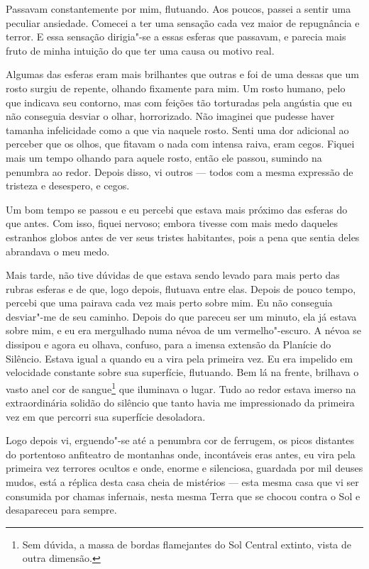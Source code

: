 Passavam constantemente por mim, flutuando. Aos poucos, passei a sentir uma peculiar ansiedade. Comecei a ter uma
sensação cada vez maior de repugnância e terror. E essa sensação dirigia"-se a essas esferas que passavam, e parecia
mais fruto de minha intuição do que ter uma causa ou motivo real.

Algumas das esferas eram mais brilhantes que outras e foi de uma dessas que um rosto surgiu de repente, olhando
fixamente para mim. Um rosto humano, pelo que indicava seu contorno, mas com feições tão torturadas pela angústia que
eu não conseguia desviar o olhar, horrorizado. Não imaginei que pudesse haver tamanha infelicidade como a que via
naquele rosto. Senti uma dor adicional ao perceber que os olhos, que fitavam o nada com intensa raiva, eram cegos.
Fiquei mais um tempo olhando para aquele rosto, então ele passou, sumindo na penumbra ao redor. Depois disso, vi
outros --- todos com a mesma expressão de tristeza e desespero, e cegos. 

Um bom tempo se passou e eu percebi que estava mais próximo das esferas do que antes. Com isso, fiquei nervoso; embora
tivesse com mais medo daqueles estranhos globos antes de ver seus tristes habitantes, pois a pena que sentia deles
abrandava o meu medo.

Mais tarde, não tive dúvidas de que estava sendo levado para mais perto das rubras esferas e de que, logo depois,
flutuava entre elas. Depois de pouco tempo, percebi que uma pairava cada vez mais perto sobre mim. Eu não conseguia
desviar"-me de seu caminho. Depois do que pareceu ser um minuto, ela já estava sobre mim, e eu era mergulhado numa névoa
de um vermelho"-escuro. A névoa se dissipou e agora eu olhava, confuso, para a imensa extensão da Planície do Silêncio.
Estava igual a quando eu a vira pela primeira vez. Eu era impelido em velocidade constante sobre sua superfície,
flutuando. Bem lá na frente, brilhava o vasto anel cor de sangue\footnote{ Sem dúvida, a massa de bordas
flamejantes do Sol Central extinto, vista de outra dimensão.} que iluminava o lugar. Tudo ao redor estava imerso
na extraordinária solidão do silêncio que tanto havia me impressionado da primeira vez em que percorri sua superfície
desoladora.

Logo depois vi, erguendo"-se até a penumbra cor de ferrugem, os picos distantes do portentoso anfiteatro de montanhas
onde, incontáveis eras antes, eu vira pela primeira vez terrores ocultos e onde, enorme e silenciosa, guardada por mil
deuses mudos, está a réplica desta casa cheia de mistérios --- esta mesma casa que vi ser consumida por chamas infernais,
nesta mesma Terra que se chocou contra o Sol e desapareceu para sempre. 

